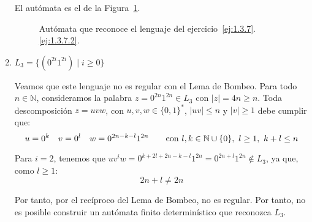 \begin{ejercicio}
\begin{enumerate}
        El autómata es el de la Figura~\ref{fig:1.3.7.2}.
        \begin{figure}
            \centering
            \caption{Autómata que reconoce el lenguaje del ejercicio~\ref{ej:1.3.7}.\ref{ej:1.3.7.2}.}
            \label{fig:1.3.7.2}
        \end{figure}
        \item $L_3=\{(0^{2i}1^{2i}) \mid i \geq 0\}$
        
        Veamos que este lenguaje no es regular con el Lema de Bombeo. Para todo $n\in \mathbb{N}$, consideramos la palabra $z=0^{2n}1^{2n}\in L_3$ con $|z|=4n\geq n$. Toda descomposición $z=uvw$, con $u,v,w\in \{0,1\}^\ast$, $|uv|\leq n$ y $|v|\geq 1$ debe cumplir que:
        \begin{equation*}
            u=0^k \quad v=0^l \quad w=0^{2n-k-l}1^{2n} \qquad \text{con } l,k\in \mathbb{N}\cup \{0\},~l\geq 1,~k+l\leq n
        \end{equation*}

        Para $i=2$, tenemos que $uv^iw=0^{k+2l+2n-k-l}1^{2n}=0^{2n+l}1^{2n}\notin L_3$, ya que, como $l\geq 1$:
        \begin{equation*}
            2n+l\neq 2n
        \end{equation*}

        Por tanto, por el recíproco del Lema de Bombeo, no es regular. Por tanto, no es posible construir un autómata finito determinístico que reconozca $L_3$.
    \end{enumerate}
\end{ejercicio}

